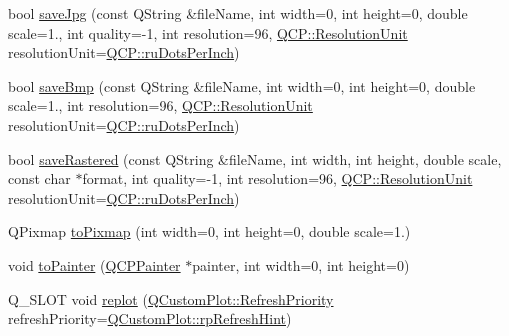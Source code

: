 \begin{DoxyCompactItemize}
\item 
bool \hyperlink{classQCustomPlot_a76f0d278e630a711fa6f48048cfd83e4}{save\+Jpg} (const Q\+String \&file\+Name, int width=0, int height=0, double scale=1., int quality=-\/1, int resolution=96, \hyperlink{namespaceQCP_a715d46153da230990aa887d0f0602452}{Q\+C\+P\+::\+Resolution\+Unit} resolution\+Unit=\hyperlink{namespaceQCP_a715d46153da230990aa887d0f0602452affb887d8efe79c39a1aca2acd7002afc}{Q\+C\+P\+::ru\+Dots\+Per\+Inch})
\item 
bool \hyperlink{classQCustomPlot_ae3a86ed0795670e50afa21759d4fa13d}{save\+Bmp} (const Q\+String \&file\+Name, int width=0, int height=0, double scale=1., int resolution=96, \hyperlink{namespaceQCP_a715d46153da230990aa887d0f0602452}{Q\+C\+P\+::\+Resolution\+Unit} resolution\+Unit=\hyperlink{namespaceQCP_a715d46153da230990aa887d0f0602452affb887d8efe79c39a1aca2acd7002afc}{Q\+C\+P\+::ru\+Dots\+Per\+Inch})
\item 
bool \hyperlink{classQCustomPlot_ad7723ce2edfa270632ef42b03a444352}{save\+Rastered} (const Q\+String \&file\+Name, int width, int height, double scale, const char $\ast$format, int quality=-\/1, int resolution=96, \hyperlink{namespaceQCP_a715d46153da230990aa887d0f0602452}{Q\+C\+P\+::\+Resolution\+Unit} resolution\+Unit=\hyperlink{namespaceQCP_a715d46153da230990aa887d0f0602452affb887d8efe79c39a1aca2acd7002afc}{Q\+C\+P\+::ru\+Dots\+Per\+Inch})
\item 
Q\+Pixmap \hyperlink{classQCustomPlot_aabb974d71ce96c137dc04eb6eab844fe}{to\+Pixmap} (int width=0, int height=0, double scale=1.)
\item 
void \hyperlink{classQCustomPlot_a1be68d5c0f1e086d6374d1340a193fb9}{to\+Painter} (\hyperlink{classQCPPainter}{Q\+C\+P\+Painter} $\ast$painter, int width=0, int height=0)
\item 
Q\+\_\+\+S\+L\+OT void \hyperlink{classQCustomPlot_aa4bfe7d70dbe67e81d877819b75ab9af}{replot} (\hyperlink{classQCustomPlot_a45d61392d13042e712a956d27762aa39}{Q\+Custom\+Plot\+::\+Refresh\+Priority} refresh\+Priority=\hyperlink{classQCustomPlot_a45d61392d13042e712a956d27762aa39a49666a5854a68dbcca8b277b03331260}{Q\+Custom\+Plot\+::rp\+Refresh\+Hint})
\end{DoxyCompactItemize}

